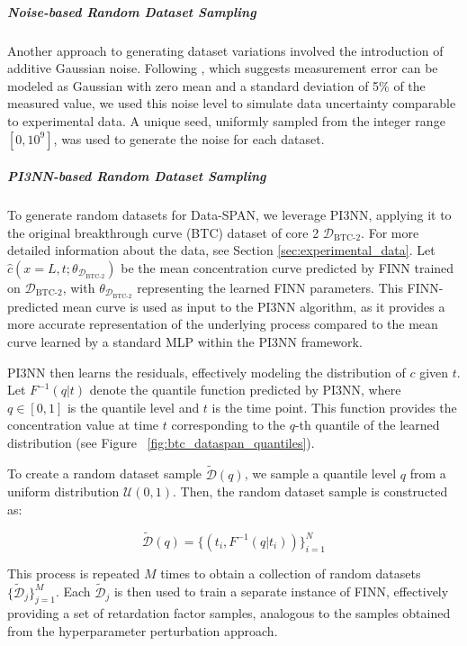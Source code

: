 \subparagraph{Noise-based Random Dataset Sampling}

Another approach to generating dataset variations involved the introduction of additive Gaussian noise. Following \cite{nowak2016entropy}, which suggests measurement error can be modeled as Gaussian with zero mean and a standard deviation of 5\% of the measured value, we used this noise level to simulate data uncertainty comparable to experimental data.
A unique seed, uniformly sampled from the integer range $[0, 10^9]$, was used to generate the noise for each dataset. %


\subparagraph{PI3NN-based Random Dataset Sampling}
\label{sec:random_dataset_sampling}
To generate random datasets for Data-SPAN, we leverage PI3NN, applying it to the original breakthrough curve (BTC) dataset of core 2 $\mathcal{D}_{\text{BTC-2}}$. For more detailed information about the data, see Section \vref{sec:experimental_data}.
Let $\hat{c}(x=L, t; \theta_{\mathcal{D}_{\text{BTC-2}}})$ be the mean concentration curve predicted by FINN trained on $\mathcal{D}_{\text{BTC-2}}$, with $\theta_{\mathcal{D}_{\text{BTC-2}}}$ representing the learned FINN parameters. This FINN-predicted mean curve is used as input to the PI3NN algorithm, as it provides a more accurate representation of the underlying process compared to the mean curve learned by a standard MLP within the PI3NN framework.

PI3NN then learns the residuals, effectively modeling the distribution of $c$ given $t$. Let $F^{-1}(q | t)$ denote the quantile function predicted by PI3NN, where $q \in [0, 1]$ is the quantile level and $t$ is the time point. This function provides the concentration value at time $t$ corresponding to the $q$-th quantile of the learned distribution (see Figure ~\vref{fig:btc_dataspan_quantiles}).

To create a random dataset sample $\tilde{\mathcal{D}}(q)$, we sample a quantile level $q$ from a uniform distribution $\mathcal{U}(0, 1)$. Then, the random dataset sample is constructed as:

$$
\tilde{\mathcal{D}}(q) = \{ (t_i, F^{-1}(q | t_i) ) \}_{i=1}^N
$$

This process is repeated $M$ times to obtain a collection of random datasets $\{\tilde{\mathcal{D}}_j\}_{j=1}^M$. Each $\tilde{\mathcal{D}}_j$ is then used to train a separate instance of FINN, effectively providing a set of retardation factor samples, analogous to the samples obtained from the hyperparameter perturbation approach.

